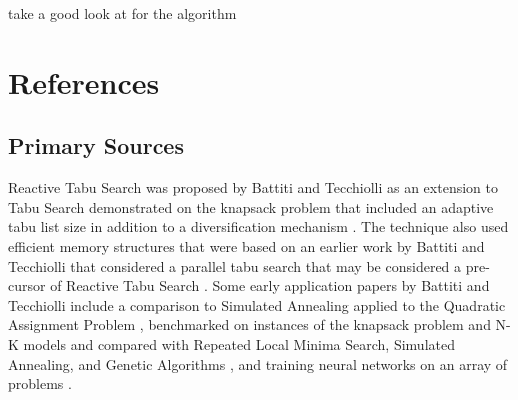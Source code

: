\documentclass[a4paper, 11pt]{article}
\begin{document}
take a good look at \cite{Battiti1995a} for the algorithm




\section{References}
\label{sec:references}

% 
% 
\subsection{Primary Sources}
Reactive Tabu Search was proposed by Battiti and Tecchiolli as an extension to Tabu Search demonstrated on the knapsack problem that included an adaptive tabu list size in addition to a diversification mechanism \cite{Battiti1994}. The technique also used efficient memory structures that were based on an earlier work by Battiti and Tecchiolli that considered a parallel tabu search that may be considered a pre-cursor of Reactive Tabu Search \cite{Battiti1992}.
Some early application papers by Battiti and Tecchiolli include a comparison to Simulated Annealing applied to the Quadratic Assignment Problem  \cite{Battiti1994a}, benchmarked on instances of the knapsack problem and N-K models and compared with Repeated Local Minima Search, Simulated Annealing, and Genetic Algorithms \cite{Battiti1995a}, and training neural networks on an array of problems \cite{Battiti1995b}.

% 
% 
\end{document}
